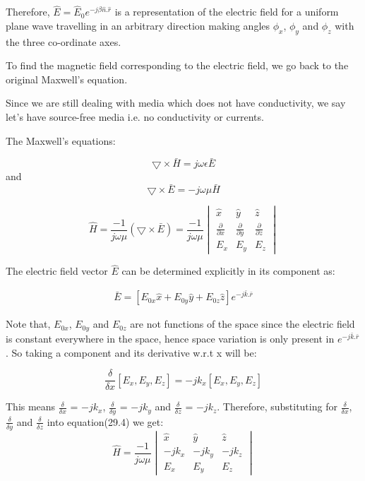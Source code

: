 Therefore, $\hat{E}=\hat{E}_{0} e^{-j\beta\hat{n}.\hat{r}}$ is a representation of the electric field for a uniform plane wave travelling in an arbitrary direction making angles $\phi_{x}$, $\phi_{y}$ and $\phi_{z}$ with the three co-ordinate axes.


To find the magnetic field corresponding to the electric field, we go back to the original Maxwell's equation.

Since we are still dealing with media which does not have conductivity, we say let's have source-free media i.e. no conductivity or currents.

The Maxwell's equations:

\begin{equation}
\bigtriangledown\times\bar{H} = j\omega\epsilon\bar{E}
\end{equation}
and
\begin{equation}
\bigtriangledown\times\bar{E} = -j\omega\mu\bar{H}
\end{equation}

\begin{equation}
\hat{H} = \frac{-1}{j\omega\mu}(\bigtriangledown\times\bar{E}) = 
\frac{-1}{j\omega\mu}
\begin{vmatrix}
\hat{x} & \hat{y} & \hat{z}\\
\frac{\partial}{\partial x} & \frac{\partial}{\partial y} & \frac{\partial}{\partial z}\\
E_{x} & E_{y} & E_{z}
\end{vmatrix}
\end{equation}

The electric field vector $\hat{E}$ can be determined explicitly in its component as:

\begin{align}
\bar{E} = [E_{0x}\hat{x} + E_{0y}\hat{y} + E_{0z}\hat{z}]e^{-j\bar{k}.\bar{r}}
\end{align}

Note that, $E_{0x}$, $E_{0y}$ and $E_{0z}$ are not functions of the space since the electric field is constant everywhere in the space, hence space variation is only present in $e^{-j\bar{k}.\bar{r}}$.
So taking a component and its derivative w.r.t x will be:

\begin{equation}
\frac{\delta}{\delta x} [E_x,E_y,E_z] = -jk_x[E_x,E_y,E_z]
\end{equation}

This means $\frac{\delta}{\delta x}$ = $-jk_x$, $\frac{\delta}{\delta y}$ = $-jk_y$ 
and $\frac{\delta}{\delta z}$ = $-jk_z$.
Therefore, substituting for $\frac{\delta}{\delta x}$, $\frac{\delta}{\delta y}$ and $\frac{\delta}{\delta z}$ into equation(29.4) we get:
\begin{equation}
\hat{H} = \frac{-1}{j\omega\mu} 
\begin{vmatrix}
\hat{x} & \hat{y} & \hat{z}\\
-jk_x & -jk_y & -jk_z\\
E_{x} & E_{y} & E_{z}
\end{vmatrix}
\end{equation}

